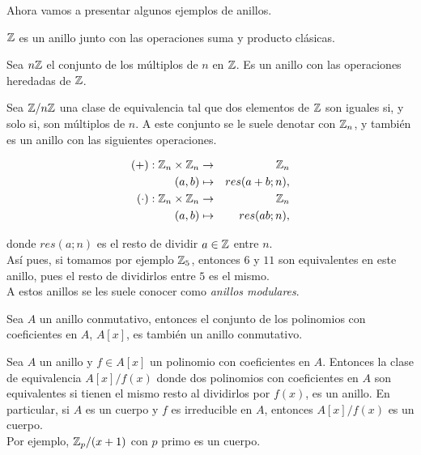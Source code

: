 Ahora vamos a presentar algunos ejemplos de anillos.

\begin{ejemplo}
	$\mathbb{Z}$ es un anillo junto con las operaciones suma y producto clásicas.
\end{ejemplo}

\begin{ejemplo}
	Sea $n\mathbb{Z}$ el conjunto de los múltiplos de $n$ en $\mathbb{Z}$. Es un anillo con las operaciones heredadas de $\mathbb{Z}$.
\end{ejemplo}

\begin{ejemplo}
	Sea $\mathbb{Z}/n\mathbb{Z}$ una clase de equivalencia tal que dos elementos de $\mathbb{Z}$ son iguales si, y solo si, son múltiplos de $n$. A este conjunto se le suele denotar con $\mathbb{Z}_n$, y también es un anillo con las siguientes operaciones.
	
	\begin{alignat}{2}
	(+): \mathbb{Z}_n \times \mathbb{Z}_n & \to & \mathbb{Z}_n \\
	(a, b) & \mapsto & res(a+b; n), \\
	(\cdot): \mathbb{Z}_n \times \mathbb{Z}_n & \to & \mathbb{Z}_n \\
	(a, b) & \mapsto & res(ab; n),
	\end{alignat}
	
	donde $res(a; n)$ es el resto de dividir $a \in \mathbb{Z}$ entre $n$.\\
	
	Así pues, si tomamos por ejemplo $\mathbb{Z}_5$, entonces $6$ y $11$ son equivalentes en este anillo, pues el resto de dividirlos entre $5$ es el mismo.\\
	
	A estos anillos se les suele conocer como \textit{anillos modulares}.
\end{ejemplo}

\begin{ejemplo}
	Sea $A$ un anillo conmutativo, entonces el conjunto de los polinomios con coeficientes en $A$, $A[x]$, es también un anillo conmutativo.
\end{ejemplo}

\begin{ejemplo}
	Sea $A$ un anillo y $f \in A[x]$ un polinomio con coeficientes en $A$. Entonces la clase de equivalencia $A[x]/f(x)$ donde dos polinomios con coeficientes en $A$ son equivalentes si tienen el mismo resto al dividirlos por $f(x)$, es un anillo. En particular, si $A$ es un cuerpo y $f$ es irreducible en $A$, entonces $A[x]/f(x)$ es un cuerpo.\\
	
	Por ejemplo, $\mathbb{Z}_p/(x+1)$ con $p$ primo es un cuerpo.
\end{ejemplo}

